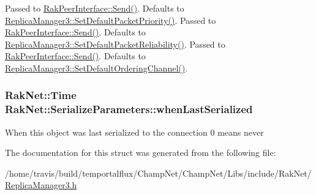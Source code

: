 Passed to \hyperlink{class_rak_net_1_1_rak_peer_interface_a543ec5be9cf5f73f5c8733d1829789f9}{Rak\-Peer\-Interface\-::\-Send()}. Defaults to \hyperlink{class_rak_net_1_1_replica_manager3_afcbcfde423edca9e386f59c2f054e753}{Replica\-Manager3\-::\-Set\-Default\-Packet\-Priority()}. Passed to \hyperlink{class_rak_net_1_1_rak_peer_interface_a543ec5be9cf5f73f5c8733d1829789f9}{Rak\-Peer\-Interface\-::\-Send()}. Defaults to \hyperlink{class_rak_net_1_1_replica_manager3_a3909030c3ad377e9b2ac1afc0e78889f}{Replica\-Manager3\-::\-Set\-Default\-Packet\-Reliability()}. Passed to \hyperlink{class_rak_net_1_1_rak_peer_interface_a543ec5be9cf5f73f5c8733d1829789f9}{Rak\-Peer\-Interface\-::\-Send()}. Defaults to \hyperlink{class_rak_net_1_1_replica_manager3_a7e01d9098c06ad5c9eac71506fad6b13}{Replica\-Manager3\-::\-Set\-Default\-Ordering\-Channel()}. \hypertarget{struct_rak_net_1_1_serialize_parameters_a9a81ebdebd1a5ed7726824d9da09cd61}{
\subsubsection[{when\-Last\-Serialized}]{\setlength{\rightskip}{0pt plus 5cm}Rak\-Net\-::\-Time Rak\-Net\-::\-Serialize\-Parameters\-::when\-Last\-Serialized}}\label{struct_rak_net_1_1_serialize_parameters_a9a81ebdebd1a5ed7726824d9da09cd61}
When this object was last serialized to the connection 0 means never 

The documentation for this struct was generated from the following file\-:\begin{DoxyCompactItemize}
\item 
/home/travis/build/temportalflux/\-Champ\-Net/\-Champ\-Net/\-Libs/include/\-Rak\-Net/\hyperlink{_replica_manager3_8h}{Replica\-Manager3.\-h}\end{DoxyCompactItemize}
